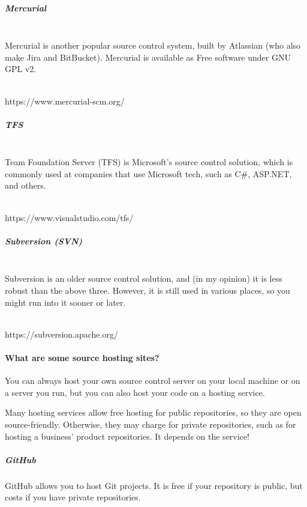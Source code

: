 \documentclass[a4paper,12pt,oneside]{book}
\begin{document}
        \subparagraph{Mercurial} ~\\

            Mercurial is another popular source control system, built
            by Atlassian (who also make Jira and BitBucket).
            Mercurial is available as Free software under GNU GPL v2.

            ~\\
            https://www.mercurial-scm.org/

        \subparagraph{TFS} ~\\

            Team Foundation Server (TFS) is Microsoft's source control
            solution, which is commonly used at companies that use
            Microsoft tech, such as C\#, ASP.NET, and others.

            ~\\
            https://www.visualstudio.com/tfs/

        \subparagraph{Subversion (SVN)} ~\\

            Subversion is an older source control solution, and (in my opinion)
            it is less robust than the above three. However, it is still
            used in various places, so you might run into it sooner or later.
            
            ~\\
            https://subversion.apache.org/

    \newpage

    \paragraph{What are some source hosting sites?}

        You can always host your own source control server on your local
        machine or on a server you run, but you can also host your code
        on a hosting service.

        Many hosting services allow free hosting for public repositories,
        so they are open source-friendly. Otherwise, they may charge
        for private repositories, such as for hosting a business' product
        repositories. It depends on the service!

        \subparagraph{GitHub}

            GitHub allows you to host Git projects. It is free if your
            repository is public, but costs if you have private repositories.
\end{document}
